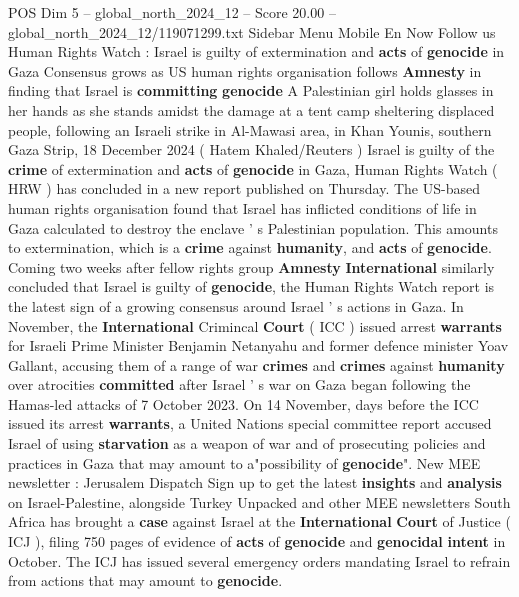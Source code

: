 \begin{textsample}{POS Dim 5 – global\_north\_2024\_12 – Score 20.00 – global\_north\_2024\_12/119071299.txt}  \label{ex:f5_pos_094}
Sidebar Menu Mobile En Now Follow us Human Rights Watch : Israel is guilty of extermination and \textbf{acts} of \textbf{genocide} in Gaza Consensus grows as US human rights organisation follows \textbf{Amnesty} in finding that Israel is \textbf{committing} \textbf{genocide} A Palestinian girl holds glasses in her hands as she stands amidst the damage at a tent camp sheltering displaced people, following an Israeli strike in Al-Mawasi area, in Khan Younis, southern Gaza Strip, 18 December 2024 ( Hatem Khaled/Reuters ) Israel is guilty of the \textbf{crime} of extermination and \textbf{acts} of \textbf{genocide} in Gaza, Human Rights Watch ( HRW ) has concluded in a new report published on Thursday.
The US-based human rights organisation found that Israel has inflicted conditions of life in Gaza calculated to destroy the enclave ' s Palestinian population.
This amounts to extermination, which is a \textbf{crime} against \textbf{humanity}, and \textbf{acts} of \textbf{genocide}.
Coming two weeks after fellow rights group \textbf{Amnesty} \textbf{International} similarly concluded that Israel is guilty of \textbf{genocide}, the Human Rights Watch report is the latest sign of a growing consensus around Israel ' s actions in Gaza.
In November, the \textbf{International} Crimincal \textbf{Court} ( ICC ) issued arrest \textbf{warrants} for Israeli Prime Minister Benjamin Netanyahu and former defence minister Yoav Gallant, accusing them of a range of war \textbf{crimes} and \textbf{crimes} against \textbf{humanity} over atrocities \textbf{committed} after Israel ' s war on Gaza began following the Hamas-led attacks of 7 October 2023.
On 14 November, days before the ICC issued its arrest \textbf{warrants}, a United Nations special committee report accused Israel of using \textbf{starvation} as a weapon of war and of prosecuting policies and practices in Gaza that may amount to a"possibility of \textbf{genocide}".
New MEE newsletter : Jerusalem Dispatch Sign up to get the latest \textbf{insights} and \textbf{analysis} on Israel-Palestine, alongside Turkey Unpacked and other MEE newsletters South Africa has brought a \textbf{case} against Israel at the \textbf{International} \textbf{Court} of Justice ( ICJ ), filing 750 pages of evidence of \textbf{acts} of \textbf{genocide} and \textbf{genocidal} \textbf{intent} in October.
The ICJ has issued several emergency orders mandating Israel to refrain from actions that may amount to \textbf{genocide}.

\end{textsample}
